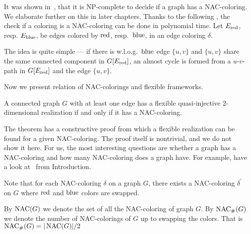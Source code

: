It was shown in~\cite{np_complete}, that it is NP-complete to decide if a graph has a NAC-coloring.
We elaborate further on this in later chapters.
Thanks to the following ,
the check if a coloring is a NAC-coloring can be done in polynomial time.
Let \( E_{\text{red}}\), resp. \( E_{\text{blue}} \), be edges colored by \( \text{red} \), resp.~\( \text{blue} \),
in an edge coloring \( \delta \).
%
%
The idea is quite simple --- if there is w.l.o.g.\ \( \text{blue} \) edge \( \{u, v\} \)
and \( \{u, v\} \) share the same connected component in \( G[E_{\text{red}}] \),
an almost cycle is formed from a \( u \)-\( v \)-path in \( G[E_{\text{red}}] \)
and the edge \( \{u, v\} \).

Now we present relation of NAC-colorings and flexible frameworks.
%
\begin{theorem}
	A connected graph \( G \) with at least one edge has a flexible
	quasi-injective \( 2 \)-dimensional realization if and only if it has a NAC-coloring.
\end{theorem}
%
The theorem has a constructive proof from which a flexible realization
can be found for a given NAC-coloring.
The proof itself is nontrivial, and we do not show it here.
For us, the most interesting questions are whether a graph has a NAC-coloring
and how many NAC-coloring does a graph have.
For example, have a look at~
from Introduction.

Note that for each NAC-coloring \( \delta \) on a graph \( G \),
there exists a NAC-coloring \( \delta^\prime \) on \( G \)
where \( \text{red} \) and \( \text{blue} \) colors are swapped.
%
\begin{definition}
	By \( \operatorname{NAC}(G) \) we denote the set of all the NAC-coloring of graph \( G \).
	By \( \operatorname{NAC}_{\#} (G) \) we denote the number of NAC-colorings of \( G \)
	up to swapping the colors.
	That is \( \operatorname{NAC}_{\#} (G) = | \operatorname{NAC}(G) | / 2 \)
\end{definition}
%

